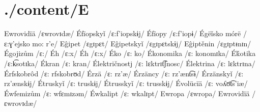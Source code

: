 \chapter{./content/E}

Ewrovidïä /ɛwrovɪdæ/ 
Éfïopskyǐ /ɛ:f’iopskɨj/ 
Éfïopy /ɛ:f’iopɨ/ 
Égëǐsko mórë /ɛ:ɣ’ejsko mo: r’e/ 
Eĝipet /ɛgɪpɛt/ 
Eĝipetskyǐ /ɛgɪpɛtskɨj/ 
Eĝiptěnin /ɛgɪptᵻnɪn/ 
Égojizům /ɛ:/ 
Éh /ɛ:x/ 
Éh /ɛ:x/ 
Éko /ɛ: ko/ 
Ékonomika /ɛ: konomɪka/ 
Éḱotika /ɛ:k͡sotɪka/ 
Ékran /ɛ: kran/ 
Élektričnostj /ɛ: lɛktrɪt͡ʃnosc/ 
Élektrina /ɛ: lɛktrɪna/ 
Érfskobrôd /ɛ: rfskobrʊd/ 
Érzä /ɛ: rz’æ/ 
Érzäncy /ɛ: rz’ænt͡sɨ/ 
Érzänskyǐ /ɛ: rz’ænskɨj/ 
Étruskyǐ /ɛ: truskɨj/ 
Étrusskyǐ /ɛ: trusskɨj/ 
Évolücïä /ɛ: voʎʊ̈t͡s’iæ/ 
Éwfemizům /ɛ: wfɛmɪzəm/ 
Éwkalipt /ɛ: wkalɪpt/ 
Ewropa /ɛwropa/ 
Ewrovidïä /ɛwrovɪdæ/
